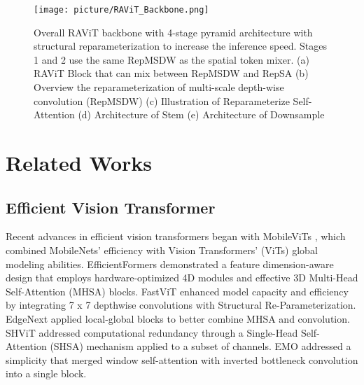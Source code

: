 \begin{figure*}
    \centering
    \texttt{[image: picture/RAViT\_Backbone.png]}
    \caption{Overall RAViT backbone with 4-stage pyramid architecture with structural reparameterization to increase the inference speed. Stages 1 and 2 use the same RepMSDW as the spatial token mixer. (a) RAViT Block that can mix between RepMSDW and RepSA (b) Overview the reparameterization of multi-scale depth-wise convolution (RepMSDW) (c) Illustration of Reparameterize Self-Attention (d) Architecture of Stem (e) Architecture of Downsample }
    \label{fig:RAViT}
\end{figure*} 
\section{Related Works}
\subsection{Efficient Vision Transformer}
Recent advances in efficient vision transformers began with MobileViTs \cite{mehta2022mobilevit}, which combined MobileNets' efficiency with Vision Transformers' (ViTs) global modeling abilities. EfficientFormers \cite{li2022efficientformer, li2023rethinking} demonstrated a feature dimension-aware design that employs hardware-optimized 4D modules and effective 3D Multi-Head Self-Attention (MHSA) blocks. FastViT \cite{vasu2023fastvit} enhanced model capacity and efficiency by integrating 7 x 7 depthwise convolutions with Structural Re-Parameterization. EdgeNext \cite{maaz2022edgenext}applied local-global blocks to better combine MHSA and convolution. SHViT \cite{yun2024shvit} addressed computational redundancy through a Single-Head Self-Attention (SHSA) mechanism applied to a subset of channels. EMO \cite{zhang2023rethinking} addressed a simplicity that merged window self-attention with inverted bottleneck convolution into a single block.

